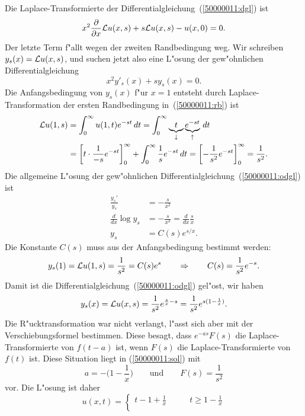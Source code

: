 \begin{loesung}
Die Laplace-Transformierte der Differentialgleichung~(\ref{50000011:dgl}) ist
\begin{equation}
x^2\frac{\partial}{\partial x}{\cal L}u(x,s) + s{\cal L}u(x,s) - u(x,0)=0.
\end{equation}
Der letzte Term f"allt wegen der zweiten Randbedingung weg.
Wir schreiben $y_s(x)={\cal L}u(x,s)$, und suchen jetzt also eine L"osung
der gew"ohnlichen Differentialgleichung
\begin{equation}
x^2y'_s(x) + sy_s(x)=0.
\label{50000011:odgl}
\end{equation}
Die Anfangsbedingung von $y_s(x)$ f"ur $x=1$ entsteht durch
Laplace-Transformation der ersten Randbedingung in~(\ref{50000011:rb}) ist
\begin{align*}
{\cal L}u(1,s)
&=
\int_0^\infty u(1,t)e^{-st}\,dt
=
\int_0^\infty \underbrace{t}_{\downarrow}\underbrace{e^{-st}}_{\uparrow}\,dt
\\
&=
\biggl[
t\cdot \frac1{-s}e^{-st}
\biggr]_0^\infty
+\int_0^\infty \frac1se^{-st}\,dt
=
\biggl[
-\frac1{s^2}e^{-st}
\biggr]_0^\infty=\frac1{s^2}.
\end{align*}
Die allgemeine L"osung der gew"ohnlichen Differentialgleichung~(\ref{50000011:odgl}) ist
\begin{align*}
\frac{y_s'}{y_s}&=-\frac{s}{x^2}
\\
\frac{d}{dx} \log y_s &= -\frac{s}{x^2}=\frac{d}{dx}\frac{s}{x}
\\
y_s&=C(s)e^{s/x}.
\end{align*}
Die Konstante $C(s)$ muss aus der Anfangsbedingung bestimmt werden:
\[
y_s(1)={\cal L}u(1,s)=\frac1{s^2}=C(s)e^{s}
\qquad\Rightarrow\qquad
C(s)=\frac1{s^2}e^{-s}.
\]
Damit ist die Differentialgleichung~(\ref{50000011:odgl}) gel"ost, wir haben
\begin{equation}
y_s(x)
=
{\cal L}u(x,s)
=
\frac1{s^2}e^{\frac{s}{x}-s}
=
\frac1{s^2}e^{s(1-\frac1x)}.
\label{50000011:sol}
\end{equation}
Die R"ucktransformation war nicht verlangt, l"asst sich aber mit der
Verschiebungsformel bestimmen.
Diese besagt, dass $e^{-as}F(s)$ die Laplace-Transformierte von 
$f(t-a)$ ist, wenn $F(s)$ die Laplace-Transformierte von $f(t)$ ist.
Diese Situation liegt in (\ref{50000011:sol}) mit
\[
a = -\biggl(1-\frac1x\biggr)
\qquad\text{und}\qquad
F(s)=\frac1{s^2}
\]
vor.
Die L"osung ist daher
\[
u(x,t)
=
\begin{cases}
t-1+\frac1x
&\qquad t \ge 1-\frac1x
\\

\end{cases}\]
\end{loesung}
